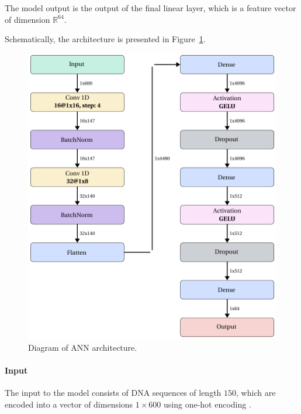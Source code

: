 \documentclass[pdflatex,sn-vancouver-num]{sn-jnl}%
\begin{document}
                The model output is the output of the final linear layer, which is a feature vector of dimension \( \mathbb{R}^{64} \).

                Schematically, the architecture is presented in Figure~\ref{Picture:NeuralModel}.

                \begin{figure}[!htb]
                    \begin{center}
                        \includegraphics[width=\textwidth]{picture_ann_network.png}
                    \end{center}
                    \caption{
                        Diagram of ANN architecture.
                    }\label{Picture:NeuralModel}
                \end{figure}

                \paragraph{Input}
                The input to the model consists of DNA sequences of length $150$, which are encoded into a vector of dimensions $1 \times 600$ using one-hot encoding \cite{HarrisDavid:2007}.
\end{document}
